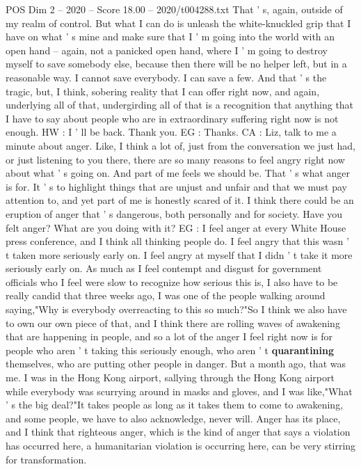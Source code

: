 \begin{textsample}{POS Dim 2 – 2020 – Score 18.00 – 2020/t004288.txt}
That ' s, again, outside of my realm of control.
But what I can do is unleash the white-knuckled grip that I have on what ' s mine and make sure that I ' m going into the world with an open hand -- again, not a panicked open hand, where I ' m going to destroy myself to save somebody else, because then there will be no helper left, but in a reasonable way.
I cannot save everybody.
I can save a few.
And that ' s the tragic, but, I think, sobering reality that I can offer right now, and again, underlying all of that, undergirding all of that is a recognition that anything that I have to say about people who are in extraordinary suffering right now is not enough.
HW : I ' ll be back.
Thank you.
EG : Thanks.
CA : Liz, talk to me a minute about anger.
Like, I think a lot of, just from the conversation we just had, or just listening to you there, there are so many reasons to feel angry right now about what ' s going on.
And part of me feels we should be.
That ' s what anger is for.
It ' s to highlight things that are unjust and unfair and that we must pay attention to, and yet part of me is honestly scared of it.
I think there could be an eruption of anger that ' s dangerous, both personally and for society.
Have you felt anger?
What are you doing with it?
EG : I feel anger at every White House press conference, and I think all thinking people do.
I feel angry that this wasn ' t taken more seriously early on.
I feel angry at myself that I didn ' t take it more seriously early on.
As much as I feel contempt and disgust for government officials who I feel were slow to recognize how serious this is, I also have to be really candid that three weeks ago, I was one of the people walking around saying,"Why is everybody overreacting to this so much?"So I think we also have to own our own piece of that, and I think there are rolling waves of awakening that are happening in people, and so a lot of the anger I feel right now is for people who aren ' t taking this seriously enough, who aren ' t \textbf{quarantining} themselves, who are putting other people in danger.
But a month ago, that was me.
I was in the Hong Kong airport, sallying through the Hong Kong airport while everybody was scurrying around in masks and gloves, and I was like,"What ' s the big deal?"It takes people as long as it takes them to come to awakening, and some people, we have to also acknowledge, never will.
Anger has its place, and I think that righteous anger, which is the kind of anger that says a violation has occurred here, a humanitarian violation is occurring here, can be very stirring for transformation.

\end{textsample}
